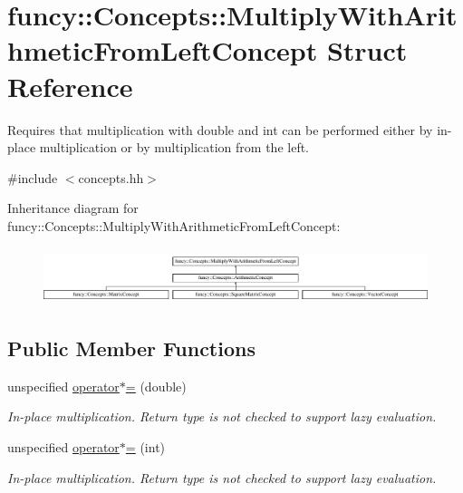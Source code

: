 \hypertarget{structfuncy_1_1Concepts_1_1MultiplyWithArithmeticFromLeftConcept}{\section{funcy\-:\-:Concepts\-:\-:Multiply\-With\-Arithmetic\-From\-Left\-Concept Struct Reference}
\label{structfuncy_1_1Concepts_1_1MultiplyWithArithmeticFromLeftConcept}
}


Requires that multiplication with double and int can be performed either by in-\/place multiplication or by multiplication from the left.  




{\ttfamily \#include $<$concepts.\-hh$>$}

Inheritance diagram for funcy\-:\-:Concepts\-:\-:Multiply\-With\-Arithmetic\-From\-Left\-Concept\-:\begin{figure}[H]
\begin{center}
\leavevmode
\includegraphics[height=1.656805cm]{structfuncy_1_1Concepts_1_1MultiplyWithArithmeticFromLeftConcept}
\end{center}
\end{figure}
\subsection*{Public Member Functions}
\begin{DoxyCompactItemize}
\item 
unspecified \hyperlink{structfuncy_1_1Concepts_1_1MultiplyWithArithmeticFromLeftConcept_a42e0bae7bb07fc186f44f85191ac1353}{operator$\ast$=} (double)
\begin{DoxyCompactList}\small\item\em In-\/place multiplication. Return type is not checked to support lazy evaluation. \end{DoxyCompactList}\item 
unspecified \hyperlink{structfuncy_1_1Concepts_1_1MultiplyWithArithmeticFromLeftConcept_a58dd8a5115ea8a6ac7d7f5076bbce423}{operator$\ast$=} (int)
\begin{DoxyCompactList}\small\item\em In-\/place multiplication. Return type is not checked to support lazy evaluation. \end{DoxyCompactList}\end{DoxyCompactItemize}


